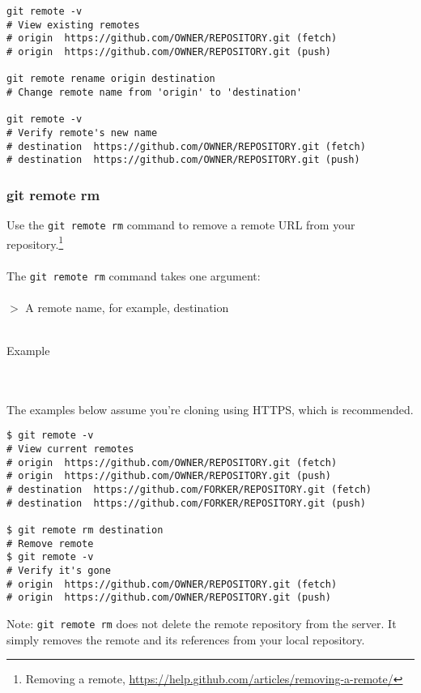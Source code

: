 \documentclass[12pt,letterpaper,dvips]{article}
\newcommand{\cmd}[1]{\texttt{#1}}
\begin{document}
\begin{Verbatim}
git remote -v
# View existing remotes
# origin  https://github.com/OWNER/REPOSITORY.git (fetch)
# origin  https://github.com/OWNER/REPOSITORY.git (push)

git remote rename origin destination
# Change remote name from 'origin' to 'destination'

git remote -v
# Verify remote's new name
# destination  https://github.com/OWNER/REPOSITORY.git (fetch)
# destination  https://github.com/OWNER/REPOSITORY.git (push)
\end{Verbatim}


\subsubsection{git remote rm}
Use the \cmd{git remote rm} command to remove a remote URL
from your repository.\footnote{Removing a remote,
\href{https://help.github.com/articles/removing-a-remote/}{https://help.github.com/articles/removing-a-remote/}}
\\
\\
The \cmd{git remote rm} command takes one argument:
\\
\\
$>$ A remote name, for example, destination
\\
\\
\noindent \begin{bf}Example\end{bf}
\\
\\
The examples below assume you're cloning using HTTPS, which is recommended.

\begin{Verbatim}
$ git remote -v
# View current remotes
# origin  https://github.com/OWNER/REPOSITORY.git (fetch)
# origin  https://github.com/OWNER/REPOSITORY.git (push)
# destination  https://github.com/FORKER/REPOSITORY.git (fetch)
# destination  https://github.com/FORKER/REPOSITORY.git (push)

$ git remote rm destination
# Remove remote
$ git remote -v
# Verify it's gone
# origin  https://github.com/OWNER/REPOSITORY.git (fetch)
# origin  https://github.com/OWNER/REPOSITORY.git (push)
\end{Verbatim}

\noindent Note: \cmd{git remote rm} does not delete the remote
repository from the server.  It simply removes the remote and
its references from your local repository.
\end{document}
